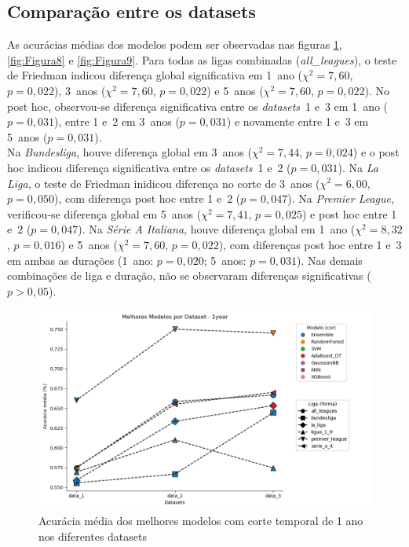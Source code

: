 \documentclass[a4paper]{article}
\theoremstyle{plain}
\theoremstyle{definition}
\begin{document}
\subsection{Comparação entre os datasets}

 As acurácias médias dos modelos podem ser observadas nas figuras \ref{fig:Figura7}, \ref{fig:Figura8} e \ref{fig:Figura9}. Para todas as ligas combinadas (\textit{all\_leagues}), o teste de Friedman indicou diferença global significativa em 1~ano ($\chi^2=7{,}60$, $p=0{,}022$), 3~anos ($\chi^2=7{,}60$, $p=0{,}022$) e 5~anos ($\chi^2=7{,}60$, $p=0{,}022$). No post hoc, observou-se diferença significativa entre os {\it datasets}~1 e~3 em 1~ano ($p=0{,}031$), entre 1 e~2 em 3~anos ($p=0{,}031$) e novamente entre 1 e~3 em 5~anos ($p=0{,}031$).\\

Na \textit{Bundesliga}, houve diferença global em 3~anos ($\chi^2=7{,}44$, $p=0{,}024$) e o post hoc indicou diferença significativa entre os {\it datasets}~1 e~2 ($p=0{,}031$). Na \textit{La Liga}, o teste de Friedman inidicou diferença no corte de 3~anos ($\chi^2=6{,}00$, $p=0{,}050$), com diferença post hoc entre 1 e~2 ($p=0{,}047$). Na \textit{Premier League}, verificou-se diferença global em 5~anos ($\chi^2=7{,}41$, $p=0{,}025$) e post hoc entre 1 e~2 ($p=0{,}047$). Na \textit{Série A Italiana}, houve diferença global em 1~ano ($\chi^2=8{,}32$, $p=0{,}016$) e 5~anos ($\chi^2=7{,}60$, $p=0{,}022$), com diferenças post hoc entre 1 e~3 em ambas as durações (1~ano: $p=0{,}020$; 5~anos: $p=0{,}031$). Nas demais combinações de liga e duração, não se observaram diferenças significativas ($p>0{,}05$).

 \begin{figure}[H]
    \centering
    \includegraphics[width=1\textwidth]{Figures/Dataset_1year.png}
    \caption{Acurácia média dos melhores modelos com corte temporal de 1 ano nos diferentes datasets}
    \label{fig:Figura7}
\end{figure}
\end{document}
